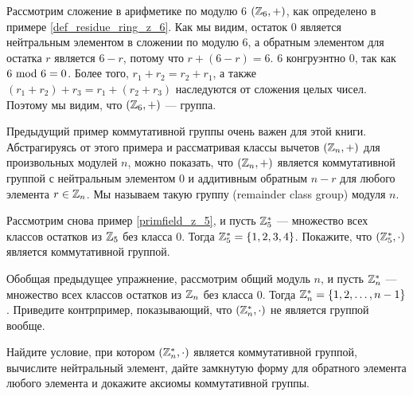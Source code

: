 \begin{example} Рассмотрим сложение в арифметике по модулю $6$ $(\mathbb{Z}_6,+)$, как определено в примере \ref{def_residue_ring_z_6}. Как мы видим, остаток $0$ является нейтральным элементом в сложении по модулю $6$, а обратным элементом для остатка $r$ является $6-r$, потому что $r+(6-r)=6$. $6$ конгруэнтно $0$, так как $6 \text{ mod } 6=0$. Более того, $r_1+r_2 = r_2 + r_1$, а также $(r_1+r_2)+r_3=r_1+(r_2+r_3)$ наследуются от сложения целых чисел. Поэтому мы видим, что $(\mathbb{Z}_6,+)$ — группа.
\end{example}
Предыдущий пример коммутативной группы очень важен для этой книги. Абстрагируясь от этого примера и рассматривая классы вычетов $(\mathbb{Z}_n,+)$ для произвольных модулей $n$, можно показать, что $(\mathbb{Z}_n,+)$ является коммутативной группой с нейтральным элементом $0$ и аддитивным обратным $n-r$ для любого элемента $r\in\mathbb{Z}_n$. Мы называем такую группу  (remainder class group) модуля $n$.
\begin{exercise}\label{fstar} Рассмотрим снова пример \ref{primfield_z_5}, и пусть $\mathbb{Z}_5^*$ — множество всех классов остатков из $\mathbb{Z}_5$ без класса $0$. Тогда $\mathbb{Z}_5^*=\{1,2,3,4\}$. Покажите, что $(\mathbb{Z}_5^*,\cdot)$ является коммутативной группой.
\end{exercise}
\begin{exercise}\label{ex:Zn*} Обобщая предыдущее упражнение, рассмотрим общий модуль $n$, и пусть $\mathbb{Z}_n^*$ — множество всех классов остатков из $\mathbb{Z}_n$ без класса $0$. Тогда $\mathbb{Z}_n^*=\{1,2,\ldots,n-1\}$. Приведите контрпример, показывающий, что $(\mathbb{Z}^*_n,\cdot)$ не является группой вообще.

Найдите условие, при котором $(\mathbb{Z}^*_n,\cdot)$ является коммутативной группой, вычислите нейтральный элемент, дайте замкнутую форму для обратного элемента любого элемента и докажите аксиомы коммутативной группы.
\end{exercise}
